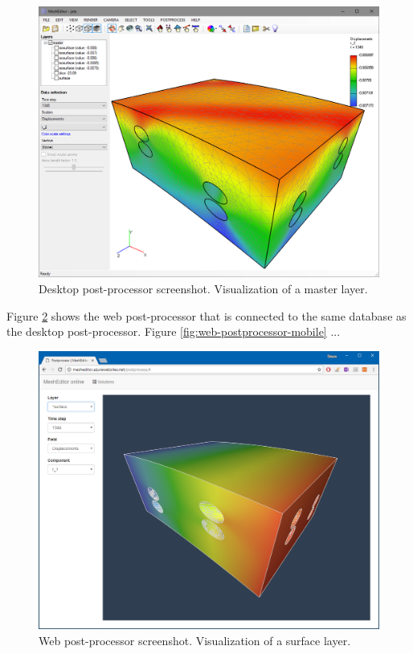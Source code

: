 \begin{figure}[H]
    \centering
    \includegraphics[width=\textwidth]{figures/chapter-data-management/desktop-postprocessor-master}
    \decoRule
    \caption{Desktop post-processor screenshot. Visualization of a master layer.}
    \label{fig:desktop-postprocessor-master}
\end{figure}

Figure \ref{fig:web-postprocessor-surface} shows the web post-processor that is connected to the same database as the desktop post-processor.
Figure \ref{fig:web-postprocessor-mobile} ...

\begin{figure}[H]
    \centering
    \includegraphics[width=\textwidth]{figures/chapter-data-management/web-postprocessor-surface}
    \decoRule
    \caption{Web post-processor screenshot. Visualization of a surface layer.}
    \label{fig:web-postprocessor-surface}
\end{figure}

